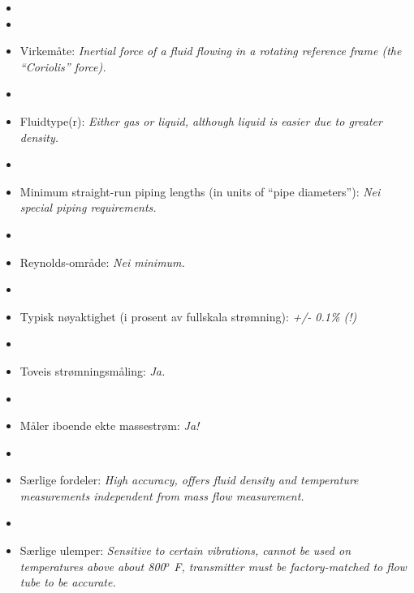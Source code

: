 \begin{itemize}
\goodbreak
\item{} 
\vskip 5pt
\item\item{} Virkemåte: {\it Inertial force of a fluid flowing in a rotating reference frame (the ``Coriolis'' force).}
\vskip 5pt
\item\item{} Fluidtype(r): {\it Either gas or liquid, although liquid is easier due to greater density.}
\vskip 5pt
\item\item{} Minimum straight-run piping lengths (in units of ``pipe diameters''): {\it Nei special piping requirements.}
\vskip 5pt
\item\item{} Reynolds-område: {\it Nei minimum.}
\vskip 5pt
\item\item{} Typisk nøyaktighet (i prosent av fullskala strømning): {\it +/- 0.1\% (!)}
\vskip 5pt
\item\item{} Toveis strømningsmåling: {\it Ja.}
\vskip 5pt
\item\item{} Måler iboende ekte massestrøm: {\it Ja!}
\vskip 5pt
\item\item{} Særlige fordeler: {\it High accuracy, offers fluid density and temperature measurements independent from mass flow measurement.}
\vskip 5pt
\item\item{} Særlige ulemper: {\it Sensitive to certain vibrations, cannot be used on temperatures above about 800$^{o}$ F, transmitter must be factory-matched to flow tube to be accurate.}
\end{itemize}

